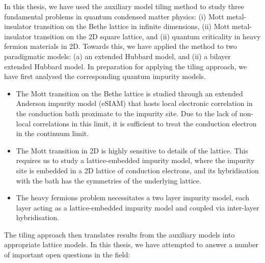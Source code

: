 In this thesis, we have used the auxiliary model tiling method to study three fundamental problems in quantum condensed matter physics: (i) Mott metal-insulator transition on the Bethe lattice in infinite dimensions, (ii) Mott metal-insulator transition on the 2D square lattice, and (ii) quantum criticality in heavy fermion materials in 2D. Towards this, we have applied the method to two paradigmatic models: (a) an extended Hubbard model, and (ii) a bilayer extended Hubbard model. In preparation for applying the tiling approach, we have first analysed the corresponding quantum impurity models.
\begin{itemize}
	\item[1.] The Mott transition on the Bethe lattice is studied through an extended Anderson impurity model (eSIAM) that hosts local electronic correlation in the conduction bath proximate to the impurity site. Due to the lack of non-local correlations in this limit, it is sufficient to treat the conduction electron in the continuum limit.
	\item[2.] The Mott transition in 2D is highly sensitive to details of the lattice. This requires us to study a lattice-embedded impurity model, where the impurity site is embedded in a 2D lattice of conduction electrons, and its hybridisation with the bath has the symmetries of the underlying lattice.
	\item[3.] The heavy fermions problem necessitates a two layer impurity model, each layer acting as a lattice-embedded impurity model and coupled via inter-layer hybridisation. 
\end{itemize}
The tiling approach then translates results from the auxiliary models into appropriate lattice models.
In this thesis, we have attempted to answer a number of important open questions in the field:

